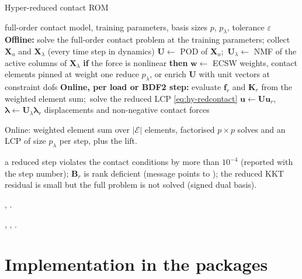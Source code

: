 \begin{algbox}{Hyper-reduced contact ROM}
\begin{pseudo}
\Require full-order contact model, training parameters, basis sizes $p$, $p_\lambda$, tolerance $\varepsilon$
\State \textbf{Offline:}
\State solve the full-order contact problem at the training parameters; collect $\bm X_u$ and $\bm X_\lambda$ (every time step in dynamics)
\State $\bm U\gets$ POD of $\bm X_u$;\ $\bm U_\lambda\gets$ NMF of the active columns of $\bm X_\lambda$ 
\State \textbf{if} the force is nonlinear \textbf{then} $\bm w\gets$ ECSW weights, contact elements pinned at weight one
  \State reduce $p_\lambda$, or enrich $\bm U$ with unit vectors at constraint dofs
\EndIf
\State \textbf{Online, per load or BDF2 step:}
\Repeat
  \State evaluate $\bm f_r$ and $\bm K_r$ from the weighted element sum;\ solve the reduced LCP \eqref{eq:hy-redcontact} 
\State $\bm u\gets\bm U\bm u_r$,\ \ $\bm\lambda\gets\bm U_\lambda\bm\lambda_r$
\Ensure displacements and non-negative contact forces
\end{pseudo}
\begin{algdet}
\item[Cost] Online: weighted element sum over $|\mathcal E|$ elements, factorised $p\times p$ solves and an LCP of size $p_\lambda$ per step, plus the lift.
\item[Fails when] a reduced step violates the contact conditions by more than $10^{-4}$ (reported with the step number); $\bm B_r$ is rank deficient (message points to ); the reduced KKT residual is small but the full problem is not solved (signed dual basis).
\item[Code] , .
\item[Verified in] , , .
\end{algdet}
\end{algbox}

\section{Implementation in the packages}\label{sec:hy-impl}

